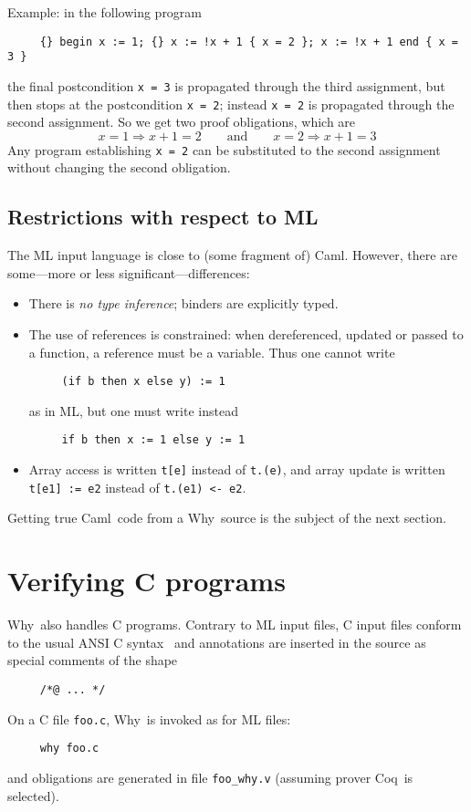 \documentclass[a4paper,12pt]{report}
\makeatletter
\newcommand{\caml}{\textsf{Caml}}
\newcommand{\coq}{\textsf{Coq}\index{Coq@\textsf{Coq}}}
\newcommand{\why}{\textsf{Why}}
\makeatother
\begin{document}
Example: in the following program
\begin{verbatim}
     {} begin x := 1; {} x := !x + 1 { x = 2 }; x := !x + 1 end { x = 3 }
\end{verbatim}
the final postcondition \texttt{x = 3} is propagated through the third
assignment, but then stops at the postcondition \texttt{x = 2};
instead \texttt{x = 2} is propagated through the second
assignment. So we get two proof obligations, which are
\begin{displaymath}
  x=1 \Rightarrow x+1=2 
  \qquad\mbox{and}\qquad
  x=2 \Rightarrow x+1=3
\end{displaymath}
Any program establishing \texttt{x = 2} can be substituted to the
second assignment without changing the second obligation.


\subsection{Restrictions with respect to ML}
The ML input language is close to (some fragment of) \caml. However,
there are some---more or less significant---differences:
\begin{itemize}
\item There is \textit{no type inference}; binders are explicitly
  typed. 
\item The use of references is constrained: when dereferenced, updated
  or passed to a function, a reference must be a variable. Thus one
  cannot write
\begin{verbatim}
     (if b then x else y) := 1
\end{verbatim}
as in ML, but one must write instead
\begin{verbatim}
     if b then x := 1 else y := 1
\end{verbatim}
\item Array access is written \texttt{t[e]} instead of \texttt{t.(e)},
  and array update is written \texttt{t[e1] := e2} instead of
  \texttt{t.(e1) <- e2}.
\end{itemize}
Getting true \caml\ code from a \why\ source is the subject of the
next section.


\section{Verifying C programs}
\label{tutorial:C}

\why\ also handles C programs.
Contrary to ML input files, C input files conform to the usual ANSI C
syntax~\cite{KR88} and annotations are inserted in the source as
special comments of the shape 
\begin{verbatim}
     /*@ ... */
\end{verbatim}
On a C file \texttt{foo.c}, \why\ is invoked as for ML files:
\begin{verbatim}
     why foo.c
\end{verbatim}
and obligations are generated in file \texttt{foo\_why.v} (assuming prover
\coq\ is selected).
\end{document}
